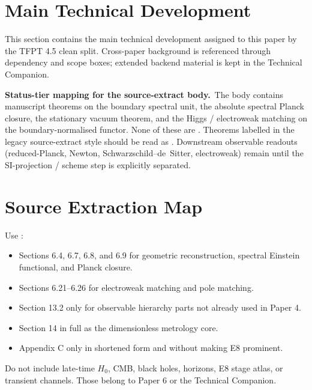 \documentclass[11pt,a4paper]{article}
\begin{document}
\clearpage
\section{Main Technical Development}

This section contains the main technical development assigned to this paper by the TFPT 4.5 clean split. Cross-paper background is referenced through dependency and scope boxes; extended backend material is kept in the Technical Companion.

\begin{tfptwarningbox}
\textbf{Status-tier mapping for the source-extract body.}\
The body contains  manuscript theorems on the boundary
spectral unit, the absolute spectral Planck closure, the
stationary vacuum theorem, and the Higgs / electroweak matching
on the boundary-normalised functor. None of these are .
Theorems labelled  in the legacy source-extract style
should be read as . Downstream observable readouts
(reduced-Planck, Newton, Schwarzschild--de~Sitter, electroweak)
remain  until the SI-projection / scheme step is
explicitly separated.
\end{tfptwarningbox}

\tfptDraftXrefNotice



\section{Source Extraction Map}

\begin{tfptsourcebox}
Use \sourceDraft:
\begin{itemize}[leftmargin=1.5em]
    \item Sections 6.4, 6.7, 6.8, and 6.9 for geometric reconstruction, spectral Einstein
    functional, and Planck closure.
    \item Sections 6.21--6.26 for electroweak matching and pole matching.
    \item Section 13.2 only for observable hierarchy parts not already used in Paper 4.
    \item Section 14 in full as the dimensionless metrology core.
    \item Appendix C only in shortened form and without making E8 prominent.
\end{itemize}
\end{tfptsourcebox}

\begin{tfptwarningbox}
Do not include late-time $H_0$, CMB, black holes, horizons, E8 stage atlas, or transient channels.
Those belong to Paper 6 or the Technical Companion.
\end{tfptwarningbox}
\end{document}
